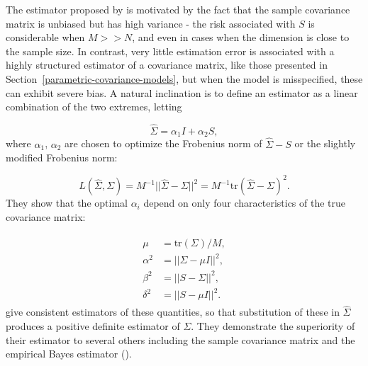 \documentclass[../chapter-1-introduction.tex]{subfiles}
\begin{document}
The estimator proposed by \citet{ledoit2004well} is motivated by the fact that the sample covariance matrix is unbiased but has high variance - the risk associated with $S$ is considerable when $M >> N$, and even in cases when the dimension is close to the sample size. In contrast, very little estimation error is associated with a highly structured estimator of a covariance matrix, like those presented in Section~\ref{parametric-covariance-models}, but when the model is misspecified, these can exhibit severe bias. A natural inclination is to define an estimator as a linear combination of the two extremes, letting

\begin{equation} \label{eq:ledoit-wolf-estimator}
\hat{\Sigma} = \alpha_1 I + \alpha_2 S,
\end{equation}
\noindent
where $\alpha_1$, $\alpha_2$ are chosen to optimize the Frobenius norm of $\hat{\Sigma} - S$ or the slightly modified Frobenius norm:

\[
L\left(\hat{\Sigma},\Sigma\right) = M^{-1} \vert \vert\hat{\Sigma}-\Sigma   \vert \vert^2 = M^{-1} \mbox{tr}\left(\hat{\Sigma}-\Sigma \right)^2.
\] 
\noindent
They show that the optimal $\alpha_i$ depend on only four characteristics of the true covariance matrix:

\begin{align}
\begin{split}
\mu &= \mbox{tr}\left(\Sigma\right)/M, \\
\alpha^2 &= \vert\vert \Sigma - \mu I\vert\vert^2, \\
\beta^2 &= \vert\vert S - \Sigma  \vert\vert^2, \\
\delta^2 &= \vert\vert S - \mu I\vert\vert^2.
\end{split}
\end{align}
\noindent
\citet{ledoit2004well} give consistent estimators of these quantities, so that substitution of these in $\hat{\Sigma}$ produces a positive definite estimator of $\Sigma$. They demonstrate the superiority of their estimator to several others including the sample covariance matrix and the empirical Bayes estimator (\citet{haff1980empirical}).
\end{document}
